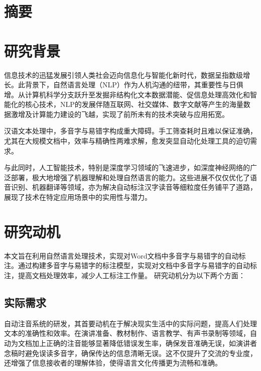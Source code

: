 \documentclass[12pt,hyperref,a4paper,UTF8]{ctexart}
\begin{document}
\cover

%
%

\thispagestyle{empty} %

\newpage
\tableofcontents

\newpage

\section{摘要}
\section{研究背景}
信息技术的迅猛发展引领人类社会迈向信息化与智能化新时代，数据呈指数级增长。此背景下，自然语言处理（NLP）作为人机沟通的纽带，其重要性与日俱增。从计算机科学分支跃升至发掘非结构化文本数据潜能、促信息处理高效化和智能化的核心技术，NLP的发展伴随互联网、社交媒体、数字文献等产生的海量数据激增及计算能力建设的飞越，实现了前所未有的技术突破与应用拓宽。

汉语文本处理中，多音字与易错字构成重大障碍。手工筛查耗时且难以保证准确，尤其在大规模文档中，效率与精确性两难求解，愈发突显自动化处理工具的迫切需求。

与此同时，人工智能技术，特别是深度学习领域的飞速进步，如深度神经网络的广泛部署，极大地增强了机器理解和处理自然语言的能力。这些进展不仅仅优化了语音识别、机器翻译等领域，亦为解决自动标注汉字读音等细粒度任务铺平了道路，展现了技术在特定应用场景中的实用性与潜力。
\section{研究动机}
本文旨在利用自然语言处理技术，实现对Word文档中多音字与易错字的自动标注。通过构建多音字与易错字的标注模型，实现对文档中多音字与易错字的自动标注，提高文档处理效率，减少人工标注工作量。
研究动机分为以下两个方面：
\subsection{实际需求}
自动注音系统的研发，其首要动机在于解决现实生活中的实际问题，提高人们处理文本的准确性和效率。在演讲准备、教材制作、语言教学、有声书录制等领域，自动为文档加上正确的注音能够显著降低错误发生率，确保发音准确无误，如演讲者念稿时避免误读多音字，确保传达的信息清晰无误。这不仅提升了交流的专业度，还增强了信息接收者的理解体验，使得语言文化传播更为流畅和准确。
\end{document}
